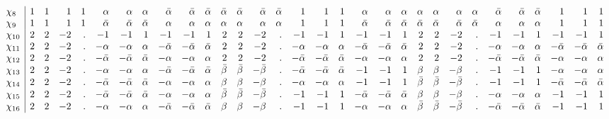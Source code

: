 \documentclass[11pt,reqno]{amsart}
\theoremstyle{definition}
\numberwithin{equation}{section}
\begin{document}
$$\begin{array}{l | rrrrrrrrrrrrrrrrrrrrrrrrrrrrrr}
\chi_8&      1&  1&  1&  1&   \alpha&   \alpha&  \alpha&  \bar\alpha&  \bar\alpha& \bar\alpha& \bar\alpha&  \bar\alpha&  \bar\alpha&  \bar\alpha&   1&   1&  1&   \alpha&   \alpha&  \alpha&  \alpha&   \alpha&   \alpha&   \alpha&  \bar\alpha&  \bar\alpha& \bar\alpha&   1&   1&  1\\
\chi_9  &    1&  1&  1&  1&  \bar\alpha&  \bar\alpha& \bar\alpha&   \alpha&   \alpha&  \alpha&  \alpha&   \alpha&   \alpha&   \alpha&   1&   1&  1&  \bar\alpha&  \bar\alpha& \bar\alpha& \bar\alpha&  \bar\alpha&  \bar\alpha&  \bar\alpha&   \alpha&   \alpha&  \alpha&   1&   1&  1\\
\chi_{10} &    2&  2& -2&  .&  -1&  -1&  1&  -1&  -1&  1&  2&   2&  -2&   .&  -1&  -1&  1&  -1&  -1&  1&  2&   2&  -2&   .&  -1&  -1&  1&  -1&  -1&  1\\
\chi_{11}&     2&  2& -2&  .&  -\alpha&  -\alpha&  \alpha& -\bar\alpha& -\bar\alpha& \bar\alpha&  2&   2&  -2&   .&  -\alpha&  -\alpha&  \alpha& -\bar\alpha& -\bar\alpha& \bar\alpha&  2&   2&  -2&   .&  -\alpha&  -\alpha&  \alpha& -\bar\alpha& -\bar\alpha& \bar\alpha\\
\chi_{12}&     2&  2& -2&  .& -\bar\alpha& -\bar\alpha& \bar\alpha&  -\alpha&  -\alpha&  \alpha&  2&   2&  -2&   .& -\bar\alpha& -\bar\alpha& \bar\alpha&  -\alpha&  -\alpha&  \alpha&  2&   2&  -2&   .& -\bar\alpha& -\bar\alpha& \bar\alpha&  -\alpha&  -\alpha&  \alpha\\
\chi_{13}&     2&  2& -2&  .&  -\alpha&  -\alpha&  \alpha& -\bar\alpha& -\bar\alpha& \bar\alpha& \bar\beta&  \bar\beta& -\bar\beta&   .& -\bar\alpha& -\bar\alpha& \bar\alpha&  -1&  -1&  1&  \beta&   \beta&  -\beta&   .&  -1&  -1&  1&  -\alpha&  -\alpha&  \alpha\\
\chi_{14} &    2&  2& -2&  .& -\bar\alpha& -\bar\alpha& \bar\alpha&  -\alpha&  -\alpha&  \alpha&  \beta&   \beta&  -\beta&   .&  -\alpha&  -\alpha&  \alpha&  -1&  -1&  1& \bar\beta&  \bar\beta& -\bar\beta&   .&  -1&  -1&  1& -\bar\alpha& -\bar\alpha& \bar\alpha\\
\chi_{15} &    2&  2& -2&  .& -\bar\alpha& -\bar\alpha& \bar\alpha&  -\alpha&  -\alpha&  \alpha& \bar\beta&  \bar\beta& -\bar\beta&   .&  -1&  -1&  1& -\bar\alpha& -\bar\alpha& \bar\alpha&  \beta&   \beta&  -\beta&   .&  -\alpha&  -\alpha&  \alpha&  -1&  -1&  1\\
\chi_{16} &    2&  2& -2&  .&  -\alpha&  -\alpha&  \alpha& -\bar\alpha& -\bar\alpha& \bar\alpha&  \beta&   \beta&  -\beta&   .&  -1&  -1&  1&  -\alpha&  -\alpha&  \alpha& \bar\beta&  \bar\beta& -\bar\beta&   .& -\bar\alpha& -\bar\alpha& \bar\alpha&  -1&  -1&  1\\

\end{array}$$
\end{document}
